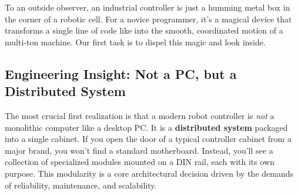 To an outside observer, an industrial controller is just a humming metal box in the corner of a robotic cell. For a novice programmer, it's a magical device that transforms a single line of code like  into the smooth, coordinated motion of a multi-ton machine. Our first task is to dispel this magic and look inside.

\subsection{Engineering Insight: Not a PC, but a Distributed System}
\label{subsec:distributed_system_insight}

The most crucial first realization is that a modern robot controller is \textit{not} a monolithic computer like a desktop PC. It is a \textbf{distributed system} packaged into a single cabinet. If you open the door of a typical controller cabinet from a major brand, you won't find a standard motherboard. Instead, you'll see a collection of specialized modules mounted on a DIN rail, each with its own purpose. This modularity is a core architectural decision driven by the demands of reliability, maintenance, and scalability.

